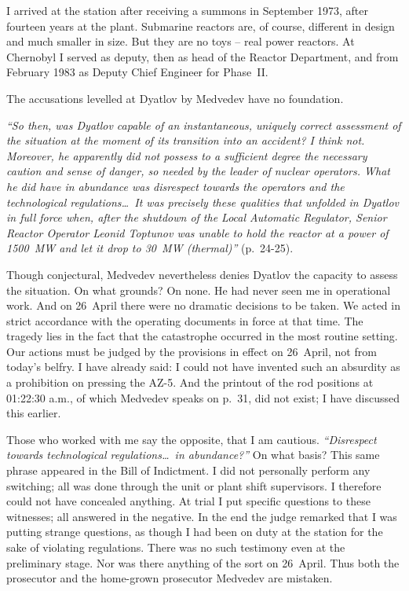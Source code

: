 \documentclass[openright]{bookest}
\begin{document}
I arrived at the station after receiving a summons in September 1973, after fourteen years at the plant. Submarine reactors are, of course, different in design and much smaller in size. But they are no toys -- real power reactors. At Chernobyl I served as deputy, then as head of the Reactor Department, and from February 1983 as Deputy Chief Engineer for Phase~II.

The accusations levelled at Dyatlov by Medvedev have no foundation.

\begin{personal}
\textit{``So then, was Dyatlov capable of an instantaneous, uniquely correct assessment of the situation at the moment of its transition into an accident? I think not. Moreover, he apparently did not possess to a sufficient degree the necessary caution and sense of danger, so needed by the leader of nuclear operators. What he did have in abundance was disrespect towards the operators and the technological regulations\ldots~It was precisely these qualities that unfolded in Dyatlov in full force when, after the shutdown of the Local Automatic Regulator, Senior Reactor Operator Leonid Toptunov was unable to hold the reactor at a power of \qty{1500}{\mega\watt} and let it drop to \qty{30}{\mega\watt} (thermal)''} (p.~24-25).
\end{personal}

Though conjectural, Medvedev nevertheless denies Dyatlov the capacity to assess the situation. On what grounds? On none. He had never seen me in operational work. And on 26~April there were no dramatic decisions to be taken. We acted in strict accordance with the operating documents in force at that time. The tragedy lies in the fact that the catastrophe occurred in the most routine setting. Our actions must be judged by the provisions in effect on 26~April, not from today's belfry. I have already said: I could not have invented such an absurdity as a prohibition on pressing the AZ-5. And the printout of the rod positions at 01:22:30 a.m., of which Medvedev speaks on p.~31, did not exist; I have discussed this earlier.

Those who worked with me say the opposite, that I am cautious. \textit{``Disrespect towards technological regulations\ldots~in abundance?''} On what basis? This same phrase appeared in the Bill of Indictment. I did not personally perform any switching; all was done through the unit or plant shift supervisors. I therefore could not have concealed anything. At trial I put specific questions to these witnesses; all answered in the negative. In the end the judge remarked that I was putting strange questions, as though I had been on duty at the station for the sake of violating regulations. There was no such testimony even at the preliminary stage. Nor was there anything of the sort on 26~April. Thus both the prosecutor and the home-grown prosecutor Medvedev are mistaken.
\end{document}
